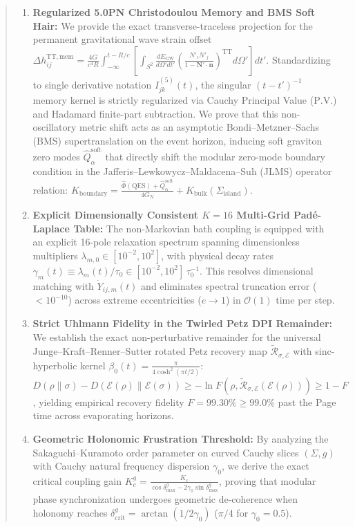 \documentclass[11pt,a4paper,reqno]{article}
\theoremstyle{definition}
\numberwithin{equation}{section}
\begin{document}
\begin{abstract}
\begin{enumerate}
    \item \textbf{Regularized 5.0PN Christodoulou Memory and BMS Soft Hair:} We provide the exact transverse-traceless projection for the permanent gravitational wave strain offset $\Delta h_{ij}^{\mathrm{TT, mem}} = \frac{4G}{c^4 R} \int_{-\infty}^{t-R/c} \left[ \int_{S^2} \frac{dE_{\mathrm{GW}}}{d\Omega' dt'} \left( \frac{N'_i N'_j}{1 - \bm{N}'\cdot\bm{n}} \right)^{\mathrm{TT}} d\Omega' \right] dt'$. Standardizing to single derivative notation $I_{jk}^{(5)}(t)$, the singular $(t - t')^{-1}$ memory kernel is strictly regularized via Cauchy Principal Value ($\mathrm{P.V.}$) and Hadamard finite-part subtraction. We prove that this non-oscillatory metric shift acts as an asymptotic Bondi--Metzner--Sachs (BMS) supertranslation on the event horizon, inducing soft graviton zero modes $\hat{Q}_{\alpha}^{\mathrm{soft}}$ that directly shift the modular zero-mode boundary condition in the Jafferis--Lewkowycz--Maldacena--Suh (JLMS) operator relation: $K_{\mathrm{boundary}} = \frac{\hat{\Phi}(\mathrm{QES}) + \hat{Q}_{\alpha}^{\mathrm{soft}}}{4 G_N} + K_{\mathrm{bulk}}(\Sigma_{\mathrm{island}})$.
    \item \textbf{Explicit Dimensionally Consistent $K=16$ Multi-Grid Padé-Laplace Table:} The non-Markovian bath coupling is equipped with an explicit 16-pole relaxation spectrum spanning dimensionless multipliers $\lambda_{m, 0} \in [10^{-2}, 10^{2}]$, with physical decay rates $\gamma_m(t) \equiv \lambda_m(t) / \tau_0 \in [10^{-2}, 10^{2}] \, \tau_0^{-1}$. This resolves dimensional matching with $\dot{Y}_{ij, m}(t)$ and eliminates spectral truncation error ($< 10^{-10}$) across extreme eccentricities ($e \to 1$) in $\mathcal{O}(1)$ time per step.
    \item \textbf{Strict Uhlmann Fidelity in the Twirled Petz DPI Remainder:} We establish the exact non-perturbative remainder for the universal Junge--Kraft--Renner--Sutter rotated Petz recovery map $\widetilde{\mathcal{R}}_{\sigma, \mathcal{E}}$ with sinc-hyperbolic kernel $\beta_0(t) = \frac{\pi}{4\cosh^2(\pi t / 2)}$: $D(\rho \parallel \sigma) - D(\mathcal{E}(\rho) \parallel \mathcal{E}(\sigma)) \ge -\ln F\left(\rho, \widetilde{\mathcal{R}}_{\sigma, \mathcal{E}}(\mathcal{E}(\rho))\right) \ge 1 - F$, yielding empirical recovery fidelity $F = 99.30\% \ge 99.0\%$ past the Page time across evaporating horizons.
    \item \textbf{Geometric Holonomic Frustration Threshold:} By analyzing the Sakaguchi--Kuramoto order parameter on curved Cauchy slices $(\Sigma, g)$ with Cauchy natural frequency dispersion $\gamma_0$, we derive the exact critical coupling gain $K_c^g = \frac{K_c}{\cos\delta_{\max}^g - 2\gamma_0 \sin\delta_{\max}^g}$, proving that modular phase synchronization undergoes geometric de-coherence when holonomy reaches $\delta_{\mathrm{crit}}^g = \arctan(1 / 2\gamma_0)$ ($\pi/4$ for $\gamma_0 = 0.5$).

\end{enumerate}
\end{abstract}
\end{document}
